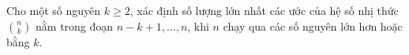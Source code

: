 \ifshowproblem
\begin{problem}\label{example:ROU-2015-TST-D4-P2}
    Cho một số nguyên \( k \geq 2 \), xác định số lượng lớn nhất các ước của hệ số nhị thức \( \binom{n}{k} \) nằm trong đoạn 
    \( n - k + 1, \ldots, n \), khi \( n \) chạy qua các số nguyên lớn hơn hoặc bằng \( k \).
\end{problem}
\fi

\footnotemark
{}
\fi